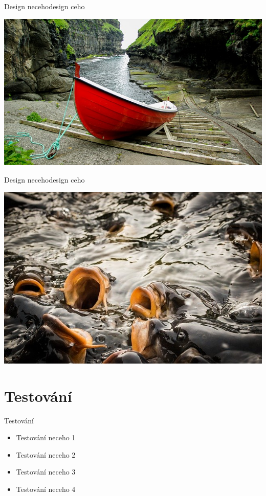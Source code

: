 \documentclass[czech,aspectratio=169]{beamer}
\begin{document}
    \begin{frame}{Design neceho}{design ceho}
        \begin{center}
            \includegraphics[width=0.7\paperwidth]{pic03.jpg}
        \end{center}
    \end{frame}
    
    \begin{frame}{Design neceho}{design ceho}
        \begin{center}
            \includegraphics[width=0.6\paperwidth]{pic04.jpg}
        \end{center}
    \end{frame}
    
    \section{Testování}
    \begin{frame}{Testování}
        \begin{itemize}
            \item Testování neceho 1
            \item Testování neceho 2
            \item Testování neceho 3
            \item Testování neceho 4
        \end{itemize}
    \end{frame}
\end{document}
